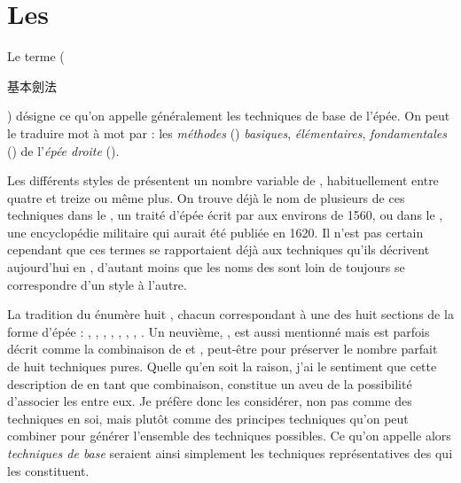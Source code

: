 \chapter{Les \Jiben{} \Jianfa{}}\label{ch:jibenjianfa}

Le terme  \Jiben{} \Jianfa{} (\begin{CJK*}{UTF8}{bsmi}基本劍法\end{CJK*}) désigne ce qu'on appelle généralement les techniques de base de l'épée. On peut le traduire mot à mot par : les \textit{méthodes} (\Fa{}) \textit{basiques}, \textit{élémentaires}, \textit{fondamentales} (\Jiben{}) de l'\textit{épée droite} (\Jian{}).

Les différents styles de \Taijijian{} présentent un nombre variable de \Jiben{} \Jianfa{}, habituellement entre quatre et treize ou même plus. On trouve déjà le nom de plusieurs de ces techniques dans le \JianJing{}, un traité d'épée écrit par \YuDayou{} aux environs de 1560, ou dans le \WubeiZhi{}, une encyclopédie militaire qui aurait été publiée en 1620.
Il n'est pas certain cependant que ces termes se rapportaient déjà aux techniques qu'ils décrivent aujourd'hui en \Taijijian{}, d'autant moins que les noms des \Jiben{} \Jianfa{} sont loin de toujours se correspondre d'un style à l'autre.

La tradition du \Yangjia{} \Michuan{} \Taijijian{} énumère huit \Jiben{} \Jianfa{}, chacun correspondant à une des huit sections de la forme d'épée \Kunlun{} : \Pi{}, \Ci{}, \Liao{}, \Zha{}, \Mo{}, \Duo{}, \Tiao{}, \Hua{}.
Un neuvième, \Dian{}, est aussi mentionné mais est parfois décrit comme la combinaison de \Pi{} et \Ci{}, peut-être pour préserver le nombre parfait de huit techniques pures.
Quelle qu'en soit la raison, j'ai le sentiment que cette description de \Dian{} en tant que combinaison, constitue un aveu de la possibilité d'associer les \Jiben{} \Jianfa{} entre eux.
Je préfère donc les considérer, non pas comme des techniques en soi, mais plutôt comme des principes techniques qu'on peut combiner pour générer l'ensemble des techniques possibles. Ce qu'on appelle alors \textit{techniques de base} seraient ainsi simplement les techniques représentatives des \Jiben{} \Jianfa{} qui les constituent.

